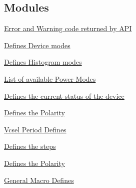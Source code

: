 \subsection*{Modules}
\begin{DoxyCompactItemize}
\item 
\hyperlink{group__VL53L0X__define__Error__group}{Error and Warning code returned by A\+PI}
\item 
\hyperlink{group__VL53L0X__define__DeviceModes__group}{Defines Device modes}
\item 
\hyperlink{group__VL53L0X__define__HistogramModes__group}{Defines Histogram modes}
\item 
\hyperlink{group__VL53L0X__define__PowerModes__group}{List of available Power Modes}
\item 
\hyperlink{group__VL53L0X__define__State__group}{Defines the current status of the device}
\item 
\hyperlink{group__VL53L0X__define__InterruptPolarity__group}{Defines the Polarity}
\item 
\hyperlink{group__VL53L0X__define__VcselPeriod__group}{Vcsel Period Defines}
\item 
\hyperlink{group__VL53L0X__define__SchedulerSequence__group}{Defines the steps}
\item 
\hyperlink{group__VL53L0X__define__SequenceStepId__group}{Defines the Polarity}
\item 
\hyperlink{group__VL53L0X__define__GeneralMacro__group}{General Macro Defines}
\end{DoxyCompactItemize}
